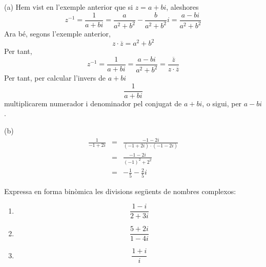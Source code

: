 \begin{solucio}
(a) Hem vist en l’exemple anterior que si $z=a+bi$, aleshores
\begin{equation*}
z^{-1}=\frac{1}{a+bi}=\frac{a}{a^{2}+b^{2}}-\frac{b}{a^{2}+b^{2}}i=\frac{a-bi
}{a^{2}+b^{2}}
\end{equation*}
Ara bé, segons l’exemple anterior,
\begin{equation*}
z\cdot \overline{z}=a^{2}+b^{2}
\end{equation*}
Per tant,
\begin{equation*}
z^{-1}=\frac{1}{a+bi}=\frac{a-bi}{a^{2}+b^{2}}=\frac{\overline{z}}{z\cdot
\overline{z}}
\end{equation*}
Per tant, per calcular l’invers de $a+bi$
\begin{equation*}
\frac{1}{a+bi}
\end{equation*}
multiplicarem numerador i denominador pel conjugat de $a+bi$, o sigui,
per $a-bi$.

(b)
\begin{eqnarray*}
\frac{1}{-1+2i} &=&\frac{-1-2i}{(-1+2i)\cdot (-1-2i)} \\
&=&\frac{-1-2i}{(-1)^{2}+2^{2}} \\
&=&-\frac{1}{5}-\frac{2}{5}i
\end{eqnarray*}
\end{solucio}

\begin{exemple}
Expressa en forma binòmica les divisions següents de nombres
complexos:

\begin{enumerate}
\item[a)]
\begin{equation*}
\frac{1-i}{2+3i}
\end{equation*}

\item[b)]
\begin{equation*}
\frac{5+2i}{1-4i}
\end{equation*}

\item[c)]
\begin{equation*}
\frac{1+i}{i}
\end{equation*}
\end{enumerate}
\end{exemple}

